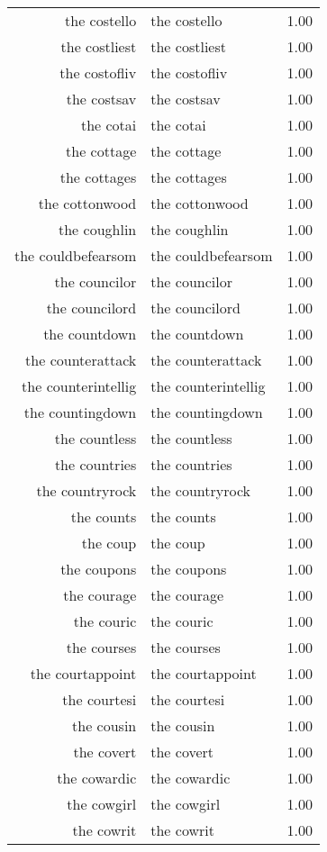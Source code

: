 \begin{table}[ht]
\begin{tabular}{rlr}
  the costello & the costello & 1.00 \\ 
  the costliest & the costliest & 1.00 \\ 
  the costofliv & the costofliv & 1.00 \\ 
  the costsav & the costsav & 1.00 \\ 
  the cotai & the cotai & 1.00 \\ 
  the cottage & the cottage & 1.00 \\ 
  the cottages & the cottages & 1.00 \\ 
  the cottonwood & the cottonwood & 1.00 \\ 
  the coughlin & the coughlin & 1.00 \\ 
  the couldbefearsom & the couldbefearsom & 1.00 \\ 
  the councilor & the councilor & 1.00 \\ 
  the councilord & the councilord & 1.00 \\ 
  the countdown & the countdown & 1.00 \\ 
  the counterattack & the counterattack & 1.00 \\ 
  the counterintellig & the counterintellig & 1.00 \\ 
  the countingdown & the countingdown & 1.00 \\ 
  the countless & the countless & 1.00 \\ 
  the countries & the countries & 1.00 \\ 
  the countryrock & the countryrock & 1.00 \\ 
  the counts & the counts & 1.00 \\ 
  the coup & the coup & 1.00 \\ 
  the coupons & the coupons & 1.00 \\ 
  the courage & the courage & 1.00 \\ 
  the couric & the couric & 1.00 \\ 
  the courses & the courses & 1.00 \\ 
  the courtappoint & the courtappoint & 1.00 \\ 
  the courtesi & the courtesi & 1.00 \\ 
  the cousin & the cousin & 1.00 \\ 
  the covert & the covert & 1.00 \\ 
  the cowardic & the cowardic & 1.00 \\ 
  the cowgirl & the cowgirl & 1.00 \\ 
  the cowrit & the cowrit & 1.00 \\ 

\end{tabular}
\end{table}
